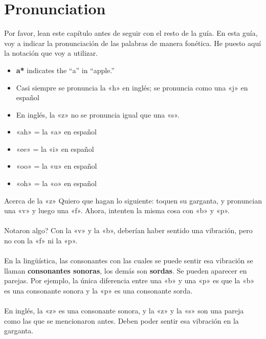 \chapter{Pronunciation}

Por favor, lean este cap\'itulo antes de seguir con el resto de la gu\'ia.
En esta guía, voy a indicar la pronunciaci\'on de las palabras de manera fon\'etica.
He puesto aquí la notaci\'on que voy a utilizar.


\begin{itemize}
	\item \textbf{a*} indicates the ``a'' in ``apple.''
	\item Casi siempre se pronuncia la «h» en inglés;
			se pronuncia como una «j» en espa\~nol
	\item En inglés, la «z» no se pronuncia igual que una «s».
	\item «ah» = la «a» en espa\~nol
	\item «ee» = la «i» en espa\~nol
	\item «oo» = la «u» en espa\~nol
	\item «oh» = la «o» en espa\~nol
\end{itemize}

\begin{conf}{Acerca de la «z»}
Quiero que hagan lo siguiente: toquen su garganta, y pronuncian una «v» y luego una «f».
	Ahora, intenten la misma cosa con «b» y «p».\\
\\
\textquestiondown Notaron algo? Con la «v» y la «b», deber\'ian haber
	sentido una vibraci\'on, pero no con la «f» ni la «p». \\
\\
En la ling\"u\'istica, las consonantes con las cuales se puede sentir esa vibraci\'on
	se llaman \textbf{consonantes sonoras}, los dem\'as son \textbf{sordas}. Se pueden
	aparecer en parejas. Por ejemplo, la \'unica diferencia entre una «b» y una «p» es
	que la «b» es una consonante sonora y la «p» es una consonante sorda.\\
\\
En ingl\'es, la «z» es una consonante sonora, y la «z» y la «s» son una pareja como las que se mencionaron antes. Deben poder sentir esa vibraci\'on en la garganta.
\end{conf}
